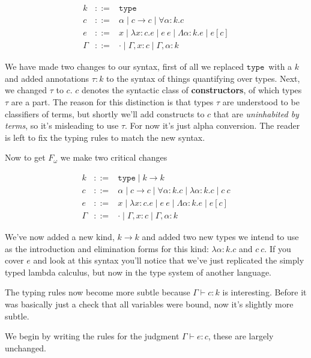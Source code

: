 \documentclass{amsart}
\newcommand{\type}{\ensuremath{\mathtt{type}}}
\begin{document}
\[
\begin{array}{lcl}
  k & ::= & \type\\
  c & ::= & \alpha \mid c \to c \mid \forall \alpha : k. c\\
  e & ::= & x \mid \lambda x : c. e \mid e\ e \mid
            \Lambda \alpha : k. e \mid e[c]\\
  \Gamma & ::= & \cdot \mid \Gamma, x : c \mid \Gamma, \alpha : k
\end{array}
\]

We have made two changes to our syntax, first of all we replaced \type \, with a
$k$ and added annotations $\tau : k$ to the syntax of things quantifying over
types. Next, we changed $\tau$ to $c$. $c$ denotes the syntactic class of {\bf
constructors}, of which types $\tau$ are a part. The reason for this distinction
is that types $\tau$ are understood to be classifiers of terms, but shortly
we'll add constructs to $c$ that are \emph{uninhabited by terms}, so it's
misleading to use $\tau$. For now it's just alpha conversion. The reader is left
to fix the typing rules to match the new syntax.

Now to get $F_\omega$ we make two critical changes

\[
\begin{array}{lcl}
  k & ::= & \type \mid k \to k\\
  c & ::= & \alpha \mid c \to c \mid \forall \alpha : k. c
            \mid \lambda \alpha : k. c \mid c\ c\\
  e & ::= & x \mid \lambda x : c. e \mid e\ e \mid
            \Lambda \alpha : k. e \mid e[c]\\
  \Gamma & ::= & \cdot \mid \Gamma, x : c \mid \Gamma, \alpha : k
\end{array}
\]

We've now added a new kind, $k \to k$ and added two new types we
intend to use as the introduction and elimination forms for this
kind: $\lambda \alpha : k. c$ and $c\ c$. If you cover $e$ and look at
this syntax you'll notice that we've just replicated the simply typed
lambda calculus, but now in the type system of another language.

The typing rules now become more subtle because $\Gamma \vdash c : k$
is interesting. Before it was basically just a check that all
variables were bound, now it's slightly more subtle.

We begin by writing the rules for the judgment $\Gamma \vdash e : c$,
these are largely unchanged.
\end{document}
